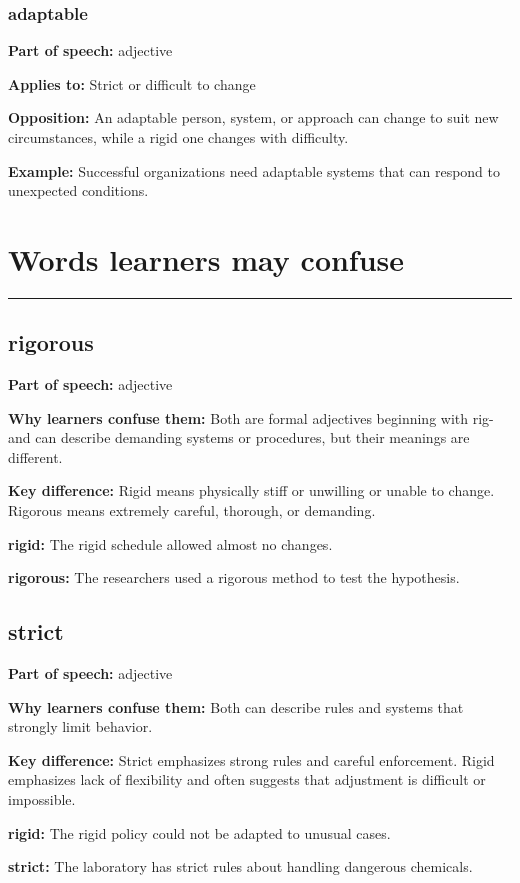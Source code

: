 \documentclass[11pt]{article}
\newcommand{\sectionrule}{\par\vspace{-0.5em}\noindent\textcolor{Accent}{\rule{\linewidth}{0.6pt}}\par}
\begin{document}
\subsubsection{adaptable}
\textbf{Part of speech:} adjective

\textbf{Applies to:} Strict or difficult to change

\textbf{Opposition:} An adaptable person, system, or approach can change to suit new circumstances, while a rigid one changes with difficulty.

\textbf{Example:} Successful organizations need adaptable systems that can respond to unexpected conditions.

\section{Words learners may confuse}
\sectionrule
\subsection{rigorous}
\textbf{Part of speech:} adjective

\textbf{Why learners confuse them:} Both are formal adjectives beginning with rig- and can describe demanding systems or procedures, but their meanings are different.

\textbf{Key difference:} Rigid means physically stiff or unwilling or unable to change. Rigorous means extremely careful, thorough, or demanding.

\textbf{rigid:} The rigid schedule allowed almost no changes.

\textbf{rigorous:} The researchers used a rigorous method to test the hypothesis.

\subsection{strict}
\textbf{Part of speech:} adjective

\textbf{Why learners confuse them:} Both can describe rules and systems that strongly limit behavior.

\textbf{Key difference:} Strict emphasizes strong rules and careful enforcement. Rigid emphasizes lack of flexibility and often suggests that adjustment is difficult or impossible.

\textbf{rigid:} The rigid policy could not be adapted to unusual cases.

\textbf{strict:} The laboratory has strict rules about handling dangerous chemicals.
\end{document}
